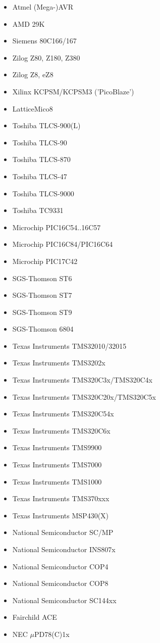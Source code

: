 \documentclass[12pt,a4paper,twoside]{report}
\begin{document}
\begin{itemize}
\item{Atmel (Mega-)AVR}
\item{AMD 29K}
\item{Siemens 80C166/167}
\item{Zilog Z80, Z180, Z380}
\item{Zilog Z8, eZ8}
\item{Xilinx KCPSM/KCPSM3 ('PicoBlaze')}
\item{LatticeMico8}
\item{Toshiba TLCS-900(L)}
\item{Toshiba TLCS-90}
\item{Toshiba TLCS-870}
\item{Toshiba TLCS-47}
\item{Toshiba TLCS-9000}
\item{Toshiba TC9331}
\item{Microchip PIC16C54..16C57}
\item{Microchip PIC16C84/PIC16C64}
\item{Microchip PIC17C42}
\item{SGS-Thomson ST6}
\item{SGS-Thomson ST7}
\item{SGS-Thomson ST9}
\item{SGS-Thomson 6804}
\item{Texas Instruments TMS32010/32015}
\item{Texas Instruments TMS3202x}
\item{Texas Instruments TMS320C3x/TMS320C4x}
\item{Texas Instruments TMS320C20x/TMS320C5x}
\item{Texas Instruments TMS320C54x}
\item{Texas Instruments TMS320C6x}
\item{Texas Instruments TMS9900}
\item{Texas Instruments TMS7000}
\item{Texas Instruments TMS1000}
\item{Texas Instruments TMS370xxx}
\item{Texas Instruments MSP430(X)}
\item{National Semiconductor SC/MP}
\item{National Semiconductor INS807x}
\item{National Semiconductor COP4}
\item{National Semiconductor COP8}
\item{National Semiconductor SC144xx}
\item{Fairchild ACE}
\item{NEC $\mu$PD78(C)1x}

\end{itemize}
\end{document}
